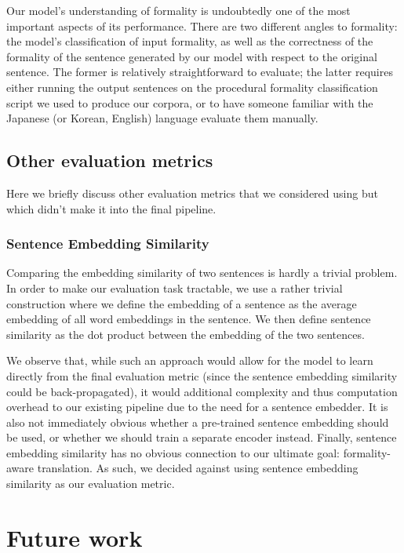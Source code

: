 \documentclass[11pt]{article}
\begin{document}
Our model's understanding of formality is undoubtedly one of the most important aspects of its performance. There are two different angles to formality: the model's classification of input formality, as well as the correctness of the formality of the sentence generated by our model with respect to the original sentence. The former is relatively straightforward to evaluate; the latter requires either running the output sentences on the procedural formality classification script we used to produce our corpora, or to have someone familiar with the Japanese (or Korean, English) language evaluate them manually.

\subsection{Other evaluation metrics}

Here we briefly discuss other evaluation metrics that we considered using but which didn't make it into the final pipeline.

\subsubsection{Sentence Embedding Similarity}

Comparing the embedding similarity of two sentences is hardly a trivial problem. In order to make our evaluation task tractable, we use a rather trivial construction where we define the embedding of a sentence as the average embedding of all word embeddings in the sentence. We then define sentence similarity as the dot product between the embedding of the two sentences. 

We observe that, while such an approach would allow for the model to learn directly from the final evaluation metric (since the sentence embedding similarity could be back-propagated), it would additional complexity and thus computation overhead to our existing pipeline due to the need for a sentence embedder. It is also not immediately obvious whether a pre-trained sentence embedding should be used, or whether we should train a separate encoder instead. Finally, sentence embedding similarity has no obvious connection to our ultimate goal: formality-aware translation. As such, we decided against using sentence embedding similarity as our evaluation metric.


\section{Future work}
\end{document}
